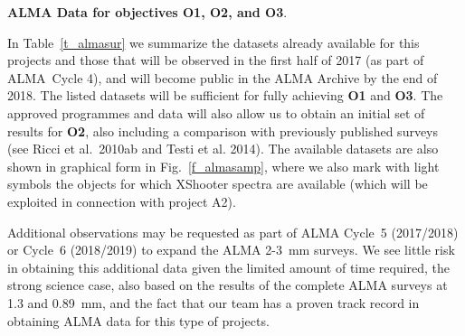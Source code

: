 \documentclass[10pt,fleqn,twoside]{article}
\begin{document}
{\bf ALMA Data for objectives O1, O2, and O3}.

In Table~\ref{t_almasur} we summarize the datasets already available for this projects and those that will be observed in the first half of 2017 (as part of ALMA~Cycle 4), and will become public in the ALMA Archive by the end of 2018. The listed datasets will be sufficient for fully achieving {\bf O1} and {\bf O3}. The approved programmes and data will also allow us to obtain an initial set of results for {\bf O2}, also including a comparison with previously published surveys (see Ricci et al.~2010ab and Testi et al. 2014).
The available datasets are also shown in graphical form in Fig.~\ref{f_almasamp}, where we also mark with light symbols the objects for which XShooter spectra are available (which will be exploited in connection with project A2).

Additional observations may be requested as part of ALMA Cycle~5 (2017/2018) or Cycle~6 (2018/2019) to expand the ALMA 2-3~mm surveys. We see little risk in obtaining this additional data given the limited amount of time required, the strong science case, also based on the results of the complete ALMA surveys at 1.3 and 0.89~mm, and the fact that our team has a proven track record in obtaining ALMA data for this type of projects.
\end{document}
